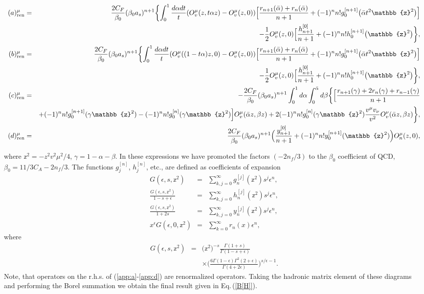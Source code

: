 \begin{widetext}
\begin{eqnarray}
(a)^\mu_{\text{ren}}&=&\frac{2C_F}{\beta_0}(\beta_0 a_s)^{n+1}\biggl\{\int_0^1 \frac{d\alpha dt}{t} (O_v^\mu(z,t\alpha z)-O_v^\mu(z,0))\Big[
\frac{r_{n+1}(\bar \alpha)+r_n(\bar \alpha)}{n+1}+(-1)^nn!g_0^{[n+1]}\big(\bar \alpha t^2 \mathbb{z}^2\big)\Big]
\\\nonumber && 
\hfill-\frac{1}{2}O_v^\mu(z,0)\Big[\frac{h_{n+1}^{[0]}}{n+1}+(-1)^nn!h_0^{[n+1]}\big(\mathbb{z}^2\big)\biggr\},
\\
(b)^\mu_{\text{ren}}&=&\frac{2C_F}{\beta_0}(\beta_0 a_s)^{n+1}\biggl\{\int_0^1\frac{d\alpha dt}{t}  (O_v^\mu((1-t\alpha) z,0)-O_v^\mu(z,0))\Big[
\frac{r_{n+1}(\bar \alpha)+r_n(\bar \alpha)}{n+1}+(-1)^nn!g_0^{[n+1]}\big(\bar \alpha t^2\mathbb{z}^2\big)\Big]
\\\nonumber && 
\hfill-\frac{1}{2}O_v^\mu(z,0)\Big[\frac{h_{n+1}^{[0]}}{n+1}+(-1)^nn!h_0^{[n+1]}\big(\mathbb{z}^2\big)\biggr\},
\\
(c)^\mu_{\text{ren}}&=&-\frac{2C_F}{\beta_0}(\beta_0 a_s)^{n+1}\int_0^1 d\alpha \int_0^{\bar \alpha} d\beta\biggl\{\Big[\frac{r_{n+1}(\gamma)+2r_n(\gamma)+r_{n-1}(\gamma)}{n+1}
\\\nonumber && +(-1)^nn!g_0^{[n+1]}(\gamma \mathbb{z}^2)-(-1)^nn!g_0^{[n]}(\gamma \mathbb{z}^2)\Big]O_v^\mu(\bar \alpha z,\beta z)
+2(-1)^n n!g_0^{[n]}(\gamma \mathbb{z}^2)\frac{v^\mu v_\nu}{v^2}O_v^\nu(\bar \alpha z,\beta z)\biggr\},
\\\label{app:d}
(d)^\mu_{\text{ren}}&=&\frac{2C_F}{\beta_0}(\beta_0 a_s)^{n+1}\Big(\frac{y_{n+1}^{[0]}}{n+1}+(-1)^nn!y_0^{[n+1]}(\mathbb{z}^2)\Big)O_n^{\mu}(z,0),
\end{eqnarray}
\end{widetext}
where $\mathbb{z}^2=-z^2 v^2\mu^2/4$, $\gamma=1-\alpha-\beta$. In these expressions we have promoted the factors $(-2n_f/3)$ to the $\beta_0$ coefficient of QCD, $\beta_0=11/3C_A-2n_f/3$. The functions $g_j^{[n]}$, $h_j^{[n]}$, etc., are defined as coefficients of expansion
\begin{eqnarray}
G(\epsilon,s,\mathbb{z}^2)&=&\sum_{k,j=0}^\infty g_n^{[j]}(\mathbb{z}^2)s^j \epsilon^n,
\\
\frac{G(\epsilon,s,\mathbb{z}^2)}{1-s+\epsilon}&=&\sum_{k,j=0}^\infty h_n^{[j]}(\mathbb{z}^2)s^j \epsilon^n,
\\
\frac{G(\epsilon,s,\mathbb{z}^2)}{1+2s}&=&\sum_{k,j=0}^\infty y_n^{[j]}(\mathbb{z}^2)s^j \epsilon^n,
\\
x^\epsilon G(\epsilon,0,\mathbb{z}^2)&=&\sum_{k=0}^\infty r_n(x) \epsilon^n,
\end{eqnarray}
where
\begin{eqnarray}
G(\epsilon,s,\mathbb{z}^2)&=&\Big(\mathbb{z}^2\Big)^{-s}\frac{\Gamma(1+s)}{\Gamma(1-s+\epsilon)}
\\\nonumber && \times \Bigg(\frac{6 \Gamma(1-\epsilon)\Gamma^2(2+\epsilon)}{\Gamma(4+2\epsilon)}\Bigg)^{s/\epsilon-1}.
\end{eqnarray}
Note, that operators on the r.h.s. of (\ref{app:a}-\ref{app:d}) are renormalized operators. Taking the hadronic matrix element of these diagrams and performing the Borel summation we obtain the final result given in Eq.\,(\ref{B[H]}).

